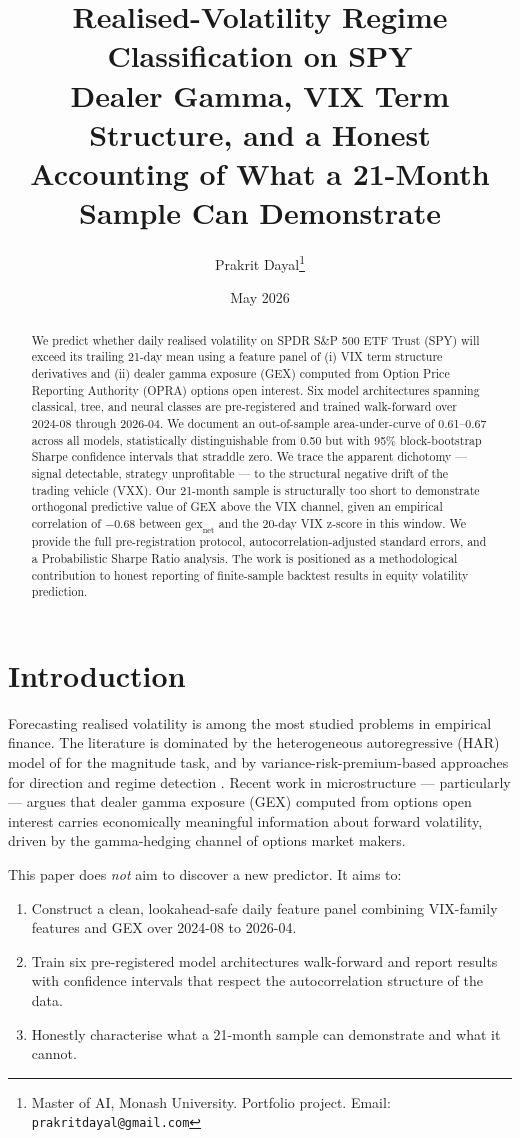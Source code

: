 \documentclass[11pt,a4paper]{article}
\title{Realised-Volatility Regime Classification on SPY\\
\large{Dealer Gamma, VIX Term Structure, and a Honest Accounting of What a 21-Month Sample Can Demonstrate}}
\author{Prakrit Dayal\thanks{Master of AI, Monash University. Portfolio project. Email: \texttt{prakritdayal@gmail.com}}}
\date{May 2026}
\begin{document}
\maketitle

\begin{abstract}
We predict whether daily realised volatility on SPDR S\&P 500 ETF Trust (SPY) will exceed its trailing 21-day mean using a feature panel of (i) VIX term structure derivatives and (ii) dealer gamma exposure (GEX) computed from Option Price Reporting Authority (OPRA) options open interest. Six model architectures spanning classical, tree, and neural classes are pre-registered and trained walk-forward over 2024-08 through 2026-04. We document an out-of-sample area-under-curve of 0.61--0.67 across all models, statistically distinguishable from 0.50 but with 95\% block-bootstrap Sharpe confidence intervals that straddle zero. We trace the apparent dichotomy --- signal detectable, strategy unprofitable --- to the structural negative drift of the trading vehicle (VXX). Our 21-month sample is structurally too short to demonstrate orthogonal predictive value of GEX above the VIX channel, given an empirical correlation of $-0.68$ between $\text{gex}_{\text{net}}$ and the 20-day VIX z-score in this window. We provide the full pre-registration protocol, autocorrelation-adjusted standard errors, and a Probabilistic Sharpe Ratio analysis. The work is positioned as a methodological contribution to honest reporting of finite-sample backtest results in equity volatility prediction.
\end{abstract}

\section{Introduction}

Forecasting realised volatility is among the most studied problems in empirical finance. The literature is dominated by the heterogeneous autoregressive (HAR) model of \cite{corsi2009har} for the magnitude task, and by variance-risk-premium-based approaches for direction and regime detection \cite{bollerslev2008}. Recent work in microstructure --- particularly \cite{barbon2021dealer} --- argues that dealer gamma exposure (GEX) computed from options open interest carries economically meaningful information about forward volatility, driven by the gamma-hedging channel of options market makers.

This paper does \emph{not} aim to discover a new predictor. It aims to:
\begin{enumerate}
    \item Construct a clean, lookahead-safe daily feature panel combining VIX-family features and GEX over 2024-08 to 2026-04.
    \item Train six pre-registered model architectures walk-forward and report results with confidence intervals that respect the autocorrelation structure of the data.
    \item Honestly characterise what a 21-month sample can demonstrate and what it cannot.
\end{enumerate}
\end{document}
